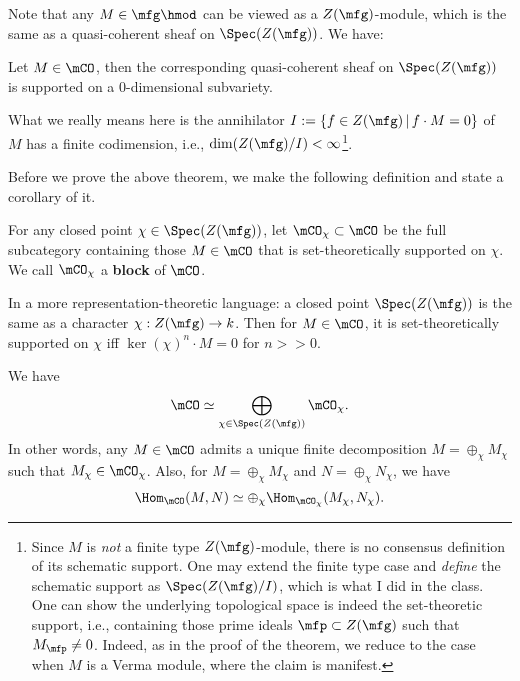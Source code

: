 Note that any $M\in \mfg\hmod$ can be viewed as a $Z(\mfg)$-module, which is the same as a quasi-coherent sheaf on $\Spec(Z(\mfg))$. We have:

\begin{thm}
	\label{thm-block}
	Let $M\in \mCO$, then the corresponding quasi-coherent sheaf on $\Spec(Z(\mfg))$ is supported on a 0-dimensional subvariety.
\end{thm}

\begin{rem}
	What we really means here is the annihilator $I:=\{ f\in Z(\mfg)\,\vert\, f\cdot M=0 \}$ of $M$ has a finite codimension, i.e., $\dim(Z(\mfg)/I)<\infty$\footnote{Since $M$ is \emph{not} a finite type $Z(\mfg)$-module, there is no consensus definition of its schematic support. One may extend the finite type case and \emph{define} the schematic support as $\Spec ( Z(\mfg)/I )$, which is what I did in the class. One can show the underlying topological space is indeed the set-theoretic support, i.e., containing those prime ideals $\mfp\subset Z(\mfg)$ such that $M_\mfp\neq 0$. Indeed, as in the proof of the theorem, we reduce to the case when $M$ is a Verma module, where the claim is manifest.}. 
\end{rem}

Before we prove the above theorem, we make the following definition and state a corollary of it.

\begin{defn}
	For any closed point $\chi\in \Spec(Z(\mfg))$, let $\mCO_\chi \subset \mCO$ be the full subcategory containing those $M\in \mCO$ that is set-theoretically supported on $\chi$. We call $\mCO_\chi$ a \textbf{block} of $\mCO$.
\end{defn}

\begin{rem}
	In a more representation-theoretic language: a closed point $\Spec(Z(\mfg))$ is the same as a character $\chi: Z(\mfg) \to k$. Then for $M\in \mCO$, it is set-theoretically supported on $\chi$ iff $\ker(\chi)^n \cdot M = 0$ for $n>>0$.

\end{rem}

\begin{cor}
	We have
	\[
		\mCO \simeq \bigoplus_{\chi\in \Spec(Z(\mfg))} \mCO_\chi.
	\]
	In other words, any $M\in \mCO$ admits a unique finite decomposition $M = \oplus_\chi M_\chi$ such that $M_\chi \in \mCO_\chi$. Also, for $M = \oplus_\chi M_\chi$ and $N = \oplus_\chi N_\chi$, we have
	\[
		\Hom_\mCO( M,N ) \simeq \oplus_\chi \Hom_{\mCO_\chi} ( M_\chi, N_\chi ).
	\]
\end{cor}

